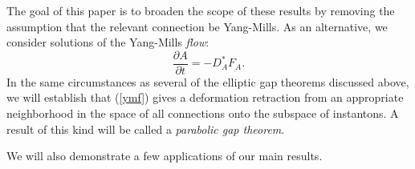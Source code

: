 \documentclass[12pt]{amsart}
\newcommand{\p}{{ \partial}}
\renewcommand{\1}{{\mathbf 1}}
\renewcommand{\p}{{\partial}}
\theoremstyle{others}
\numberwithin{equation}{section}
\begin{document}
The goal of this paper is to broaden the scope of these results by removing the %
assumption that the relevant connection be Yang-Mills. As an alternative,
we consider solutions of the Yang-Mills \emph{flow}:
\begin{equation}\label{ymf}
\frac{\p A}{\p t} = - D_A^*F_A.
\end{equation}
In the same circumstances 
as several of the elliptic gap theorems discussed above, we will 
establish that (\ref{ymf})
gives a deformation retraction from an appropriate 
neighborhood in the space of all connections 
onto the %
subspace of instantons. A result of this kind will be called a \emph{parabolic gap theorem}.

We will also demonstrate a few applications of our main results.


\vspace{5mm}

\end{document}

